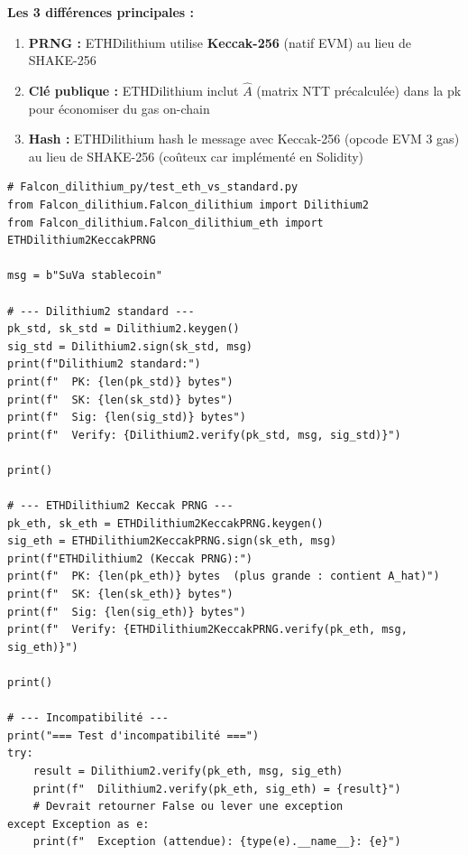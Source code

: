 \documentclass[12pt, a4paper]{article}
\begin{document}
\begin{solution}
\textbf{Les 3 différences principales :}

\begin{tcolorbox}[colback=suva_blue!5, colframe=suva_blue!40]
\begin{enumerate}
  \item \textbf{PRNG :} ETHDilithium utilise \textbf{Keccak-256} (natif EVM) au lieu de SHAKE-256
  \item \textbf{Clé publique :} ETHDilithium inclut $\hat{A}$ (matrix NTT précalculée) dans la pk pour économiser du gas on-chain
  \item \textbf{Hash :} ETHDilithium hash le message avec Keccak-256 (opcode EVM 3 gas) au lieu de SHAKE-256 (coûteux car implémenté en Solidity)
\end{enumerate}
\end{tcolorbox}

\begin{lstlisting}[style=python]
# Falcon_dilithium_py/test_eth_vs_standard.py
from Falcon_dilithium.Falcon_dilithium import Dilithium2
from Falcon_dilithium.Falcon_dilithium_eth import ETHDilithium2KeccakPRNG

msg = b"SuVa stablecoin"

# --- Dilithium2 standard ---
pk_std, sk_std = Dilithium2.keygen()
sig_std = Dilithium2.sign(sk_std, msg)
print(f"Dilithium2 standard:")
print(f"  PK: {len(pk_std)} bytes")
print(f"  SK: {len(sk_std)} bytes")
print(f"  Sig: {len(sig_std)} bytes")
print(f"  Verify: {Dilithium2.verify(pk_std, msg, sig_std)}")

print()

# --- ETHDilithium2 Keccak PRNG ---
pk_eth, sk_eth = ETHDilithium2KeccakPRNG.keygen()
sig_eth = ETHDilithium2KeccakPRNG.sign(sk_eth, msg)
print(f"ETHDilithium2 (Keccak PRNG):")
print(f"  PK: {len(pk_eth)} bytes  (plus grande : contient A_hat)")
print(f"  SK: {len(sk_eth)} bytes")
print(f"  Sig: {len(sig_eth)} bytes")
print(f"  Verify: {ETHDilithium2KeccakPRNG.verify(pk_eth, msg, sig_eth)}")

print()

# --- Incompatibilité ---
print("=== Test d'incompatibilité ===")
try:
    result = Dilithium2.verify(pk_eth, msg, sig_eth)
    print(f"  Dilithium2.verify(pk_eth, sig_eth) = {result}")
    # Devrait retourner False ou lever une exception
except Exception as e:
    print(f"  Exception (attendue): {type(e).__name__}: {e}")
\end{lstlisting}
\end{solution}
\end{document}
